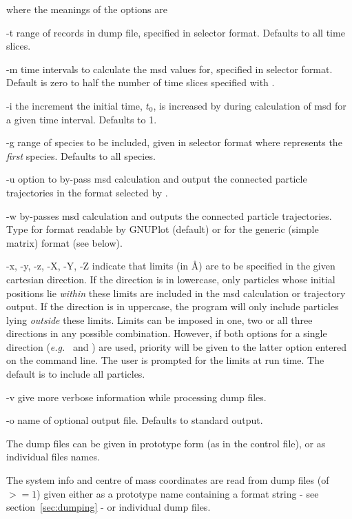 \documentclass[a4paper,twoside]{report}
\newcommand{\eg}{\emph{e.g.}}
\begin{document}
where the meanings of the options are
\begin{Argdescription}
\item[-t] range of records in dump file, specified in selector format. Defaults to all time slices.
\item[-m] time intervals to calculate the msd values for, specified in
  selector format. Default is zero to half the number of time slices specified with .
\item[-i] the increment the initial time, $t_0$, is increased by during
calculation of msd for a given time interval. Defaults to 1.
\item[-g] range of species to be included, given in selector
  format where  represents the \emph{first} species. Defaults
  to all species. 
\item[-u] option to by-pass msd calculation and output the connected particle
trajectories in the format selected by . 
\item[-w] by-passes msd calculation and outputs the connected particle trajectories.
Type  for format readable by GNUPlot (default) or  for the generic (simple matrix) format 
(see below). 
\item[-x, -y, -z, -X, -Y, -Z] indicate that limits (in {\AA}) are to be
  specified in the given cartesian direction. If the direction is in
  lowercase, only particles whose initial positions lie \emph{within}
  these limits are included in the msd calculation or trajectory
  output. If the direction is in uppercase, the program will only
  include particles lying \emph{outside} these limits. Limits can be
  imposed in one, two or all three directions in any possible
  combination. However, if both options for a single direction (\eg\
   and ) are used, priority will be given to the
  latter option entered on the command line. The user is prompted for
  the limits at run time. The default is to include all particles.
\item[-v] give more verbose information while processing dump files.
\item[-o] name of optional output file. Defaults to standard output.
\end{Argdescription}

The dump files can be given in prototype form (as in the control file), or as individual files names.

The system info and centre of mass coordinates are read from dump files (of 
$>= 1$) given either as a prototype name containing a \Lit{printf()} format
string - see section~\ref{sec:dumping} - or individual dump files.
\end{document}
